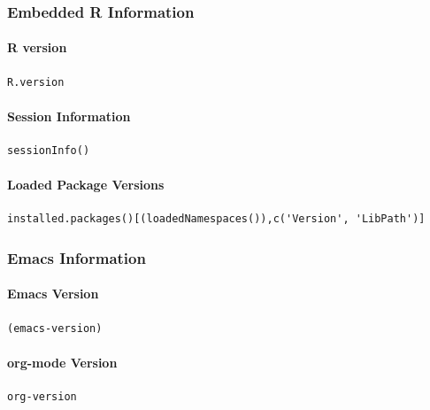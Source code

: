 \documentclass[11pt]{article}
\begin{document}
\subsubsection{Embedded R Information}
\label{sec:org3bcd215}

\paragraph{R version}
\label{sec:org24bb25a}

\begin{verbatim}
R.version
\end{verbatim}

\paragraph{Session Information}
\label{sec:org13bd9bb}

\begin{verbatim}
sessionInfo()
\end{verbatim}

\paragraph{Loaded Package Versions}
\label{sec:org91da9ed}

\begin{verbatim}
installed.packages()[(loadedNamespaces()),c('Version', 'LibPath')]
\end{verbatim}

\subsubsection{Emacs Information}
\label{sec:org0a222f9}

\paragraph{Emacs Version}
\label{sec:org8d3cab5}

\begin{verbatim}
(emacs-version)
\end{verbatim}

\paragraph{org-mode Version}
\label{sec:orga084460}

\begin{verbatim}
org-version
\end{verbatim}
\end{document}
